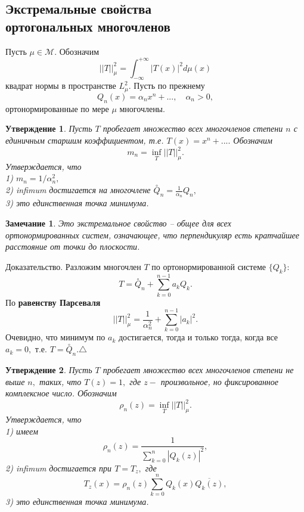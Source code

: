 \documentclass[12pt,a4paper]{article}
\theoremstyle{plain}   \newtheorem{Pro}{Задача}
\newtheorem{Sta}{Утверждение}
\newtheorem{Rem}{Замечание}
\begin{document}
\subsection{Экстремальные свойства \\
ортогональных многочленов}
$ \; $
\\
Пусть
$ \mu \in \mathcal{M}. $
Обозначим
$$
  ||T||_{\mu}^2 =\int _{-\infty}^{+\infty}
  |T(x)|^2 d\mu (x)
$$
квадрат нормы в пространстве
$ L_{\mu}^2 . $
Пусть по прежнему
$$
  Q_n (x)=\alpha _n x^n +... , \quad
  \alpha _n >0,
$$
ортонормированные по мере
$ \mu $
многочлены.
\begin{Sta}
Пусть
$ T $
пробегает множество всех многочленов степени
$ n $
с единичным старшим коэффициентом, т.е.
$ T(x)=x^n +.... $
Обозначим
$$
  m_n = \inf _T ||T||_{\mu}^2 .
$$
Утверждается, что
\\
1) $ m_n =1/\alpha _n ^2 , $
\\
2) infimum достигается на многочлене
$ \overset{\circ}{Q}_n = \frac{1}{\alpha _n}Q_n , $
\\
3) это единственная точка минимума.
\end{Sta}
\begin{Rem}
Это экстремальное свойство -- общее для всех ортонормированных
систем, означающее, что перпендикуляр есть кратчайшее расстояние
от точки до плоскости.
\end{Rem}
{\Large Доказательство.}
Разложим многочлен
$ T $
по ортонормированной системе
$ \{ Q_k \} : $
$$
  T=\overset{\circ}{Q}_n+\sum _{k=0}^{n-1}a_k Q_k .
$$
По
{\bfseries равенству Парсеваля}
$$
  ||T||_{\mu}^2 =\frac{1}{\alpha _n ^2 }+\sum _{k=0}^{n-1}|a_k|^2 .
$$
Очевидно, что минимум по
$ a_k $
достигается, тогда и только тогда, когда все
$ a_k =0 , $
т.е.
$ T=\overset {\circ}{Q}_n . \triangle $
\begin{Sta}
Пусть
$ T $
пробегает множество всех многочленов степени не выше
$ n , $
таких, что
$ T(z)=1 , $
где
$ z - $
произвольное, но фиксированное комплексное число.
Обозначим
$$
  \rho _n (z)=\inf _T ||T||_{\mu}^2 .
$$
Утверждается, что
\\
1) имеем
$$
  \rho _n (z)=\frac{1}
  {\sum _{k=0}^n |Q_k (z)|^2},
$$
2) infimum достигается при
$ T=T_z , $
где
$$
  T_z (x)=\rho _n (z) \sum _{k=0}^n Q_k (x) \overline {Q_k (z)},
$$
3) это единственная точка минимума.
\end{Sta}
\end{document}

